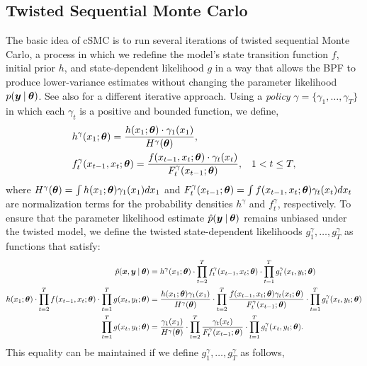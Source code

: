 \documentclass[twoside]{article}
\begin{document}
\subsection{Twisted Sequential Monte Carlo}
The basic idea of cSMC is to run several iterations of twisted sequential Monte Carlo, a process in which we redefine the model's state transition function $f$, initial prior $h$, and state-dependent likelihood $g$ in a way that allows the BPF to produce lower-variance estimates without changing the parameter likelihood $p(\boldsymbol{y} \:\vert\: \boldsymbol{\theta})$. See also \cite{guarniero2017iterated} for a different iterative approach. Using a \emph{policy} $\gamma = \{\gamma_1, \ldots, \gamma_T\}$ in which each $\gamma_t$ is a positive and bounded function, we define,
\begin{align*}
&h^\gamma(x_1; \boldsymbol{\theta}) = \frac{h(x_1; \boldsymbol{\theta}) \cdot \gamma_1(x_1)}{H^\gamma(\boldsymbol{\theta})}, & & \\
&f^\gamma_t(x_{t-1}, x_{t}; \boldsymbol{\theta}) = \frac{f(x_{t-1}, x_t; \boldsymbol{\theta}) \cdot \gamma_t(x_t)}{F^\gamma_t(x_{t-1}; \boldsymbol{\theta})}, & & 1 < t \leq T,
\end{align*}
where $H^\gamma(\boldsymbol{\theta}) = \int h(x_1; \boldsymbol{\theta}) \gamma_1(x_1) dx_1$ and $F^\gamma_t(x_{t-1}; \boldsymbol{\theta}) = \int f(x_{t-1}, x_t; \boldsymbol{\theta})\gamma_t(x_t) dx_t$ are normalization terms for the probability densities $h^\gamma$ and $f^\gamma_t$, respectively.  To ensure that the parameter likelihood estimate $\hat{p}(\boldsymbol{y} \:\vert\: \boldsymbol{\theta})$ remains unbiased under the twisted model, we define the twisted state-dependent likelihoods $g_1^\gamma, \ldots, g_T^\gamma$ as functions that satisfy:
\begin{align*}
\hat{p}(\boldsymbol{x}, \boldsymbol{y} \:\vert\: \boldsymbol{\theta}) &= h^\gamma(x_1; \boldsymbol{\theta}) \cdot \prod_{t=2}^T f^\gamma_t(x_{t-1}, x_t; \boldsymbol{\theta}) \cdot \prod_{t=1}^T g^\gamma_t(x_t, y_t; \boldsymbol{\theta}) \\
h(x_1; \boldsymbol{\theta}) \cdot \prod_{t=2}^T f(x_{t-1}, x_t; \boldsymbol{\theta}) \cdot \prod_{t=1}^T g(x_t, y_t; \boldsymbol{\theta}) &= \frac{h(x_1; \boldsymbol{\theta}) \gamma_1(x_1)}{H^\gamma(\boldsymbol{\theta})} \cdot \prod_{t=2}^T \frac{f(x_{t-1}, x_t; \boldsymbol{\theta})\gamma_t(x_t; \boldsymbol{\theta}) }{F^\gamma_t(x_{t-1}; \boldsymbol{\theta})} \cdot \prod_{t=1}^T g^\gamma_t(x_t, y_t; \boldsymbol{\theta}) \\
\prod_{t=1}^T g(x_t, y_t; \boldsymbol{\theta}) &= \frac{\gamma_1(x_1)}{H^\gamma(\boldsymbol{\theta})} \cdot \prod_{t=2}^T \frac{\gamma_t(x_t) }{F^\gamma_t(x_{t-1}; \boldsymbol{\theta})} \cdot \prod_{t=1}^T g^\gamma_t(x_t, y_t; \boldsymbol{\theta}).
\end{align*}
This equality can be maintained if we define $g^\gamma_1, \ldots, g^\gamma_T$ as follows,
\end{document}
